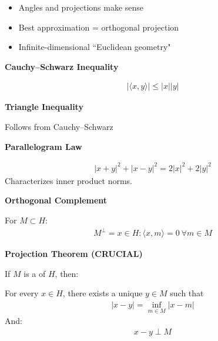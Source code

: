 \documentclass[12pt,a4paper]{report}
\begin{document}
\begin{description}
\item {}
\begin{itemize}
\item Angles and projections make sense
\item Best approximation = orthogonal projection
\item Infinite-dimensional ``Euclidean geometry"
\end{itemize}

\item {}
\begin{description}
    \item \textbf{Cauchy–Schwarz Inequality}

\begin{align*}
|\langle x,y\rangle| \le |x||y|
\end{align*}

    \item \textbf{Triangle Inequality}

Follows from Cauchy–Schwarz

    \item \textbf{Parallelogram Law}

\begin{align*}
|x+y|^2 + |x-y|^2 = 2|x|^2 + 2|y|^2
\end{align*}
 Characterizes inner product norms.
\end{description}

\item {}

\begin{description}
    \item \textbf{Orthogonal Complement}

For $M \subset H$:
\begin{align*}
M^\perp = {x \in H : \langle x,m\rangle = 0 \ \forall m\in M}
\end{align*}

    \item \textbf{Projection Theorem (CRUCIAL)}

If $M$ is a  of $H$, then:

For every $x\in H$, there exists a unique $y\in M$ such that
\begin{align*}
|x-y| = \inf_{m\in M} |x-m|
\end{align*}
And:
\begin{align*}
x - y \perp M
\end{align*}


\end{description}
\end{description}
\end{document}
